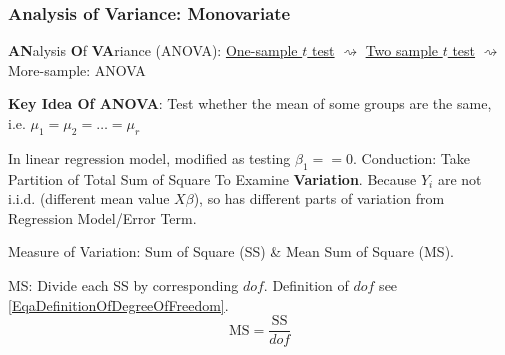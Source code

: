 \subsubsection{Analysis of Variance: Monovariate}
    \textbf{AN}alysis \textbf{O}f \textbf{VA}riance (ANOVA): \hyperlink{OneSampletTest}{One-sample $ t $ test} $\rightsquigarrow $ \hyperlink{TwoSampletTest}{Two sample $ t $ test} $\rightsquigarrow $ More-sample: ANOVA

\begin{point}
    \textbf{Key Idea Of ANOVA}: Test whether the mean of some groups are the same, i.e. $ \mu_1=\mu _2=\ldots=\mu _r $ 
\end{point}



    In linear regression model, modified as testing $ \beta _1==0 $. Conduction: Take Partition of Total Sum of Square To Examine \textbf{Variation}. Because $ Y_i $ are not i.i.d. (different mean value $ X\beta  $), so has different parts of variation from Regression Model/Error Term.




    Measure of Variation: Sum of Square (SS) \& Mean Sum of Square (MS).

    MS: Divide each SS by corresponding $ dof $. Definition of $ dof $ see \autoref{EqaDefinitionOfDegreeOfFreedom}.
    \begin{equation}
        \mathrm{MS}=\dfrac{\mathrm{SS}}{dof} 
    \end{equation}

